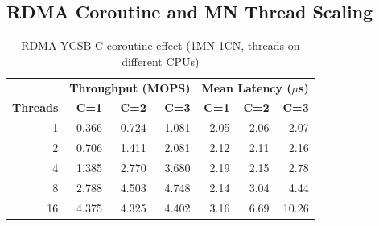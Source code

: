\documentclass[conference]{IEEEtran}
\begin{document}
\begin{table}[H]
\centering
\caption{Paper Fig.~10 vs.\ RDMA per-MN-thread peak throughput (MOPS). Exact hardware match (r320/CX-3 IB FDR), normalized to per-MN-thread.}
\label{tab:paper-fig10}
\scriptsize
{}
\end{table}

\subsection*{RDMA Coroutine and MN Thread Scaling}

\begin{table}[H]
\centering
\caption{RDMA YCSB-C coroutine effect (1MN 1CN, threads on different CPUs)}
\label{tab:rdma-coro-1cn}
\scriptsize
\begin{tabular}{@{}rrrr|rrr@{}}
\toprule
& \multicolumn{3}{c|}{\textbf{Throughput (MOPS)}} & \multicolumn{3}{c}{\textbf{Mean Latency ($\mu$s)}} \\
\textbf{Threads} & \textbf{C=1} & \textbf{C=2} & \textbf{C=3} & \textbf{C=1} & \textbf{C=2} & \textbf{C=3} \\
\midrule
1  & 0.366 & 0.724 & 1.081 & 2.05 & 2.06 & 2.07 \\
2  & 0.706 & 1.411 & 2.081 & 2.12 & 2.11 & 2.16 \\
4  & 1.385 & 2.770 & 3.680 & 2.19 & 2.15 & 2.78 \\
8  & 2.788 & 4.503 & 4.748 & 2.14 & 3.04 & 4.44 \\
16 & 4.375 & 4.325 & 4.402 & 3.16 & 6.69 & 10.26 \\
\bottomrule
\end{tabular}
\end{table}
\end{document}
